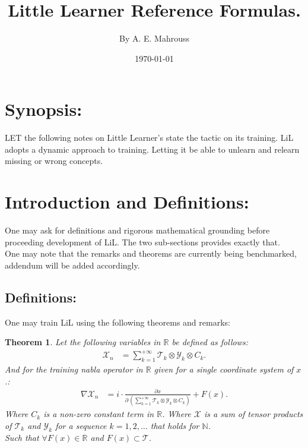 \documentclass[10pt]{article}
\title{%
	\vspace{-1.5em}%
	\large\textbf{Little Learner Reference Formulas.}%
}
\author{By A. E. Mahrouss}
\date{\today}
\theoremstyle{plain}
\newtheorem{theorem}{Theorem}[section]
\theoremstyle{definition}
\theoremstyle{remark}
\begin{document}

\maketitle
\tableofcontents
\newpage

\section{Synopsis:}

\lettrine[lines=1, lhang=0.1, loversize=0.2]{L}ET the following notes on Little Learner's state the tactic on its training. LiL adopts a dynamic approach to training. Letting it be able to unlearn and relearn missing or wrong concepts.

\section{Introduction and Definitions:}

One may ask for definitions and rigorous mathematical grounding before proceeding development of LiL. The two sub-sections provides exactly that.\\
One may note that the remarks and theorems are currently being benchmarked, addendum will be added accordingly.

\subsection{Definitions:}

One may train LiL using the following theorems and remarks:

\begin{theorem}
Let the following variables in $\mathbb{R}$ be defined as follows:
\begin{align*}
    \mathcal{X}_n &= \sum_{k=1}^{+\infty} \mathcal{T}_k \otimes \mathcal{Y}_k \otimes C_k.
\end{align*}
And for the training nabla operator in $\mathbb{R}$ given for a single coordinate system of $x$.:
\begin{align*}
	\nabla \mathcal{X}_n &= i \cdot \frac{\partial x}{\partial \, (\sum_{k=1}^{+\infty} \mathcal{T}_k \otimes \mathcal{Y}_k \otimes C_k)} + F(x).
\end{align*}
Where $C_k$ is a non-zero constant term in $\mathbb{R}$. Where $\mathcal{X}$ is a sum of tensor products of $\mathcal{T}_k$ and $\mathcal{Y}_k$ for a sequence $k=1, 2, \ldots$ that holds for $\mathbb{N}$.\\
Such that $\forall F(x) \in \mathbb{R}$ and $F(x) \subset \mathcal{T}$.
\end{theorem}
\end{document}
